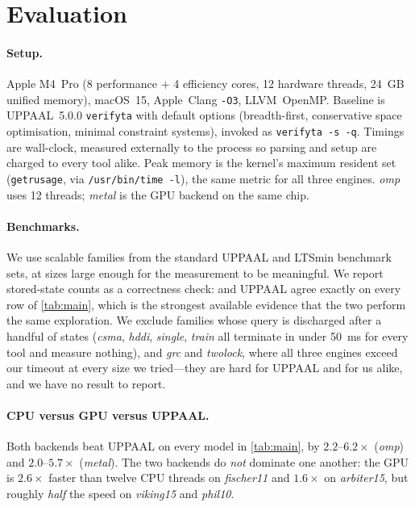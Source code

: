 \section{Evaluation}\label{sec:eval}

\paragraph{Setup.}  Apple M4~Pro (8 performance + 4 efficiency cores, 12 hardware
threads, 24~GB unified memory), macOS~15, Apple~Clang \texttt{-O3}, LLVM~OpenMP.
Baseline is UPPAAL~5.0.0 \texttt{verifyta} with default options (breadth-first,
conservative space optimisation, minimal constraint systems), invoked as
\texttt{verifyta -s -q}.  Timings are wall-clock, measured externally to the
process so parsing and setup are charged to every tool alike.  Peak memory is the
kernel's maximum resident set (\texttt{getrusage}, via \texttt{/usr/bin/time -l}),
the same metric for all three engines.  \tool{} \emph{omp} uses 12 threads;
\emph{metal} is the GPU backend on the same chip.

\paragraph{Benchmarks.}  We use scalable families from the standard UPPAAL and
LTSmin benchmark sets, at sizes large enough for the measurement to be
meaningful.  We report stored-state counts as a correctness check: \tool{} and
UPPAAL agree exactly on every row of \cref{tab:main}, which is the strongest
available evidence that the two perform the same exploration.  We exclude
families whose query is discharged after a handful of states (\emph{csma},
\emph{hddi}, \emph{single}, \emph{train} all terminate in under
\SI{50}{\milli\second} for every tool and measure nothing), and \emph{grc} and
\emph{twolock}, where all three engines exceed our timeout at every size we
tried---they are hard for UPPAAL and for us alike, and we have no result to
report.



\paragraph{CPU versus GPU versus UPPAAL.}

Both \tool{} backends beat UPPAAL on every model in \cref{tab:main}, by
$2.2$--$6.2\times$ (\emph{omp}) and $2.0$--$5.7\times$ (\emph{metal}).  The two
backends do \emph{not} dominate one another: the GPU is $2.6\times$ faster than
twelve CPU threads on \emph{fischer11} and $1.6\times$ on \emph{arbiter15}, but
roughly \emph{half} the speed on \emph{viking15} and \emph{phil10}.

